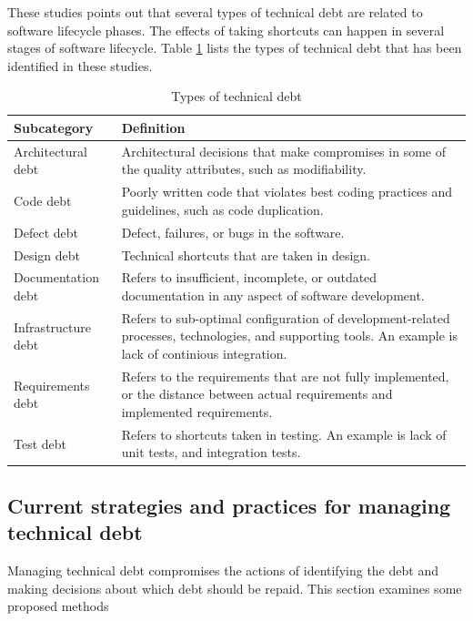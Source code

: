 These studies points out that several types of technical debt are related to software lifecycle phases. The effects of taking shortcuts can happen in several stages of software lifecycle. Table \ref{tab:subcategories} lists the types of technical debt that has been identified in these studies.

\begin{table}
	\centering
	\begin{tabular}{ | p{5cm} | p{8cm} |}
	\hline
	\textbf{Subcategory} & \textbf{Definition} \\ \hline
	Architectural debt\cite{li2015systematic,p8-codabux,foser076-brown} & Architectural decisions that make compromises in some of the quality attributes, such as modifiability. \\ \hline
	Code debt\cite{li2015systematic,foser076-brown,tom2013exploration} & Poorly written code that violates best coding practices and guidelines, such as code duplication. \\ \hline
	Defect debt\cite{li2015systematic,tom2013exploration} & Defect, failures, or bugs in the software. \\ \hline
	Design debt\cite{li2015systematic,Zazworka:2011:PDD:1985362.1985372,foser076-brown} & Technical shortcuts that are taken in design.\\ \hline
	Documentation debt\cite{li2015systematic,foser076-brown,Zazworka:2013:CSE:2460999.2461005} & Refers to insufficient, incomplete, or outdated documentation in any aspect of software development.\\ \hline
	Infrastructure debt\cite{li2015systematic,tom2013exploration,p8-codabux} & Refers to sub-optimal configuration of development-related processes, technologies, and supporting tools. An example is lack of continious integration.\\ \hline
	Requirements debt\cite{li2015systematic,Zazworka:2013:CSE:2460999.2461005} & Refers to the requirements that are not fully implemented, or the distance between actual requirements and implemented requirements.\\ \hline
	Test debt\cite{li2015systematic,Zazworka:2013:CSE:2460999.2461005,foser076-brown} & Refers to shortcuts taken in testing. An example is lack of unit tests, and integration tests.\\
	\hline
	\end{tabular}
	\caption{Types of technical debt} \label{tab:subcategories}
\end{table}

\subsection{Current strategies and practices for managing technical debt}
Managing technical debt compromises the actions of identifying the debt and making decisions about which debt should be repaid\cite{foser076-brown,krutchen,url-mcconnell}. This section examines some proposed methods

